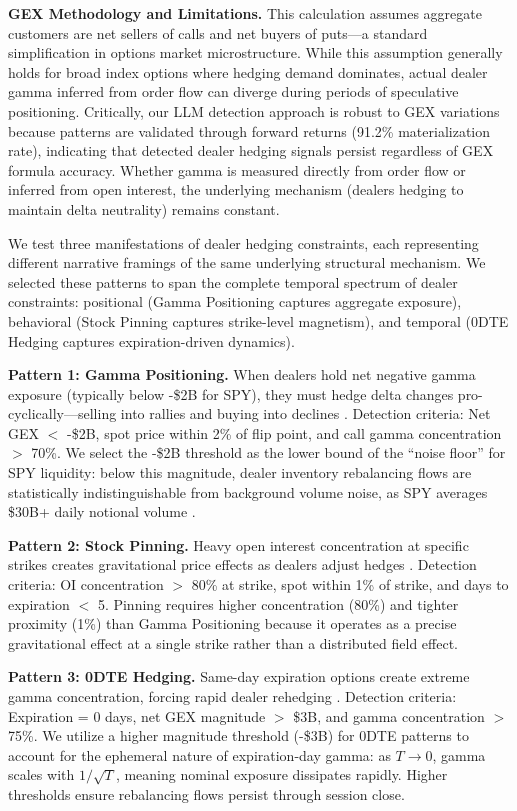 \textbf{GEX Methodology and Limitations.} This calculation assumes aggregate customers are net sellers of calls and net buyers of puts—a standard simplification in options market microstructure. While this assumption generally holds for broad index options where hedging demand dominates, actual dealer gamma inferred from order flow can diverge during periods of speculative positioning. Critically, our LLM detection approach is robust to GEX variations because patterns are validated through forward returns (91.2\% materialization rate), indicating that detected dealer hedging signals persist regardless of GEX formula accuracy. Whether gamma is measured directly from order flow or inferred from open interest, the underlying mechanism (dealers hedging to maintain delta neutrality) remains constant.

We test three manifestations of dealer hedging constraints, each representing different narrative framings of the same underlying structural mechanism. We selected these patterns to span the complete temporal spectrum of dealer constraints: positional (Gamma Positioning captures aggregate exposure), behavioral (Stock Pinning captures strike-level magnetism), and temporal (0DTE Hedging captures expiration-driven dynamics).

\textbf{Pattern 1: Gamma Positioning.} When dealers hold net negative gamma exposure (typically below -\$2B for SPY), they must hedge delta changes pro-cyclically—selling into rallies and buying into declines \citep{garleanu2009demand,nomura2017}. Detection criteria: Net GEX $<$ -\$2B, spot price within 2\% of flip point, and call gamma concentration $>$ 70\%. We select the -\$2B threshold as the lower bound of the ``noise floor'' for SPY liquidity: below this magnitude, dealer inventory rebalancing flows are statistically indistinguishable from background volume noise, as SPY averages \$30B+ daily notional volume \citep{spotgamma2021}.

\textbf{Pattern 2: Stock Pinning.} Heavy open interest concentration at specific strikes creates gravitational price effects as dealers adjust hedges \citep{ni2005stock}. Detection criteria: OI concentration $>$ 80\% at strike, spot within 1\% of strike, and days to expiration $<$ 5. Pinning requires higher concentration (80\%) and tighter proximity (1\%) than Gamma Positioning because it operates as a precise gravitational effect at a single strike rather than a distributed field effect.

\textbf{Pattern 3: 0DTE Hedging.} Same-day expiration options create extreme gamma concentration, forcing rapid dealer rehedging \citep{cboe2023,jpmorgan2023}. Detection criteria: Expiration = 0 days, net GEX magnitude $>$ \$3B, and gamma concentration $>$ 75\%. We utilize a higher magnitude threshold (-\$3B) for 0DTE patterns to account for the ephemeral nature of expiration-day gamma: as $T \to 0$, gamma scales with $1/\sqrt{T}$, meaning nominal exposure dissipates rapidly. Higher thresholds ensure rebalancing flows persist through session close.

